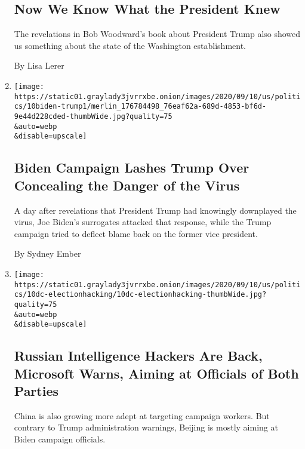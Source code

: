 \begin{enumerate}
  \hypertarget{now-we-know-what-the-president-knew}{%
  \subsection{Now We Know What the President
  Knew}\label{now-we-know-what-the-president-knew}}

  The revelations in Bob Woodward's book about President Trump also
  showed us something about the state of the Washington establishment.

  By Lisa Lerer
\item
  \href{/2020/09/10/us/politics/biden-trump-virus-woodward.html}{}

  \texttt{[image: https://static01.graylady3jvrrxbe.onion/images/2020/09/10/us/politics/10biden-trump1/merlin\_176784498\_76eaf62a-689d-4853-bf6d-9e44d228cded-thumbWide.jpg?quality=75\\\&auto=webp\\\&disable=upscale]}

  \hypertarget{biden-campaign-lashes-trump-over-concealing-the-danger-of-the-virus}{%
  \subsection{Biden Campaign Lashes Trump Over Concealing the Danger of
  the
  Virus}\label{biden-campaign-lashes-trump-over-concealing-the-danger-of-the-virus}}

  A day after revelations that President Trump had knowingly downplayed
  the virus, Joe Biden's surrogates attacked that response, while the
  Trump campaign tried to deflect blame back on the former vice
  president.

  By Sydney Ember
\item
  \href{/2020/09/10/us/politics/russian-hacking-microsoft-biden-trump.html}{}

  \texttt{[image: https://static01.graylady3jvrrxbe.onion/images/2020/09/10/us/politics/10dc-electionhacking/10dc-electionhacking-thumbWide.jpg?quality=75\\\&auto=webp\\\&disable=upscale]}

  \hypertarget{russian-intelligence-hackers-are-back-microsoft-warns-aiming-at-officials-of-both-parties}{%
  \subsection{Russian Intelligence Hackers Are Back, Microsoft Warns,
  Aiming at Officials of Both
  Parties}\label{russian-intelligence-hackers-are-back-microsoft-warns-aiming-at-officials-of-both-parties}}

  China is also growing more adept at targeting campaign workers. But
  contrary to Trump administration warnings, Beijing is mostly aiming at
  Biden campaign officials.


\end{enumerate}
